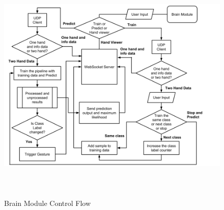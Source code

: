 \begin{figure}
	[h] \centering 
	\includegraphics[height=115mm]{figures/content/brain-flow.png} \caption{Brain Module Control Flow} \label{fg:brain:flow} 
\end{figure}

